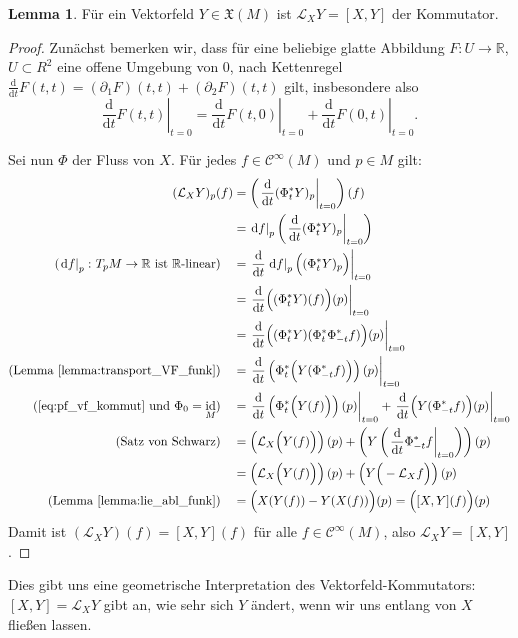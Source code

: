 \documentclass[a4paper]{scrbook}
\numberwithin{equation}{chapter}
\newcommand{\D}{\mathrm{d}}
\DeclareMathOperator{\id}{id}
\newcommand{\sC}{\mathcal{C}^{\infty}}
\theoremstyle{definition}
\newtheorem{lemma}[defn]{Lemma}
\begin{document}
\begin{lemma}
	Für ein Vektorfeld $Y \in \mathfrak X(M)$ ist $\mathcal L_X Y = [X,Y]$ der Kommutator.

	\begin{proof}
		Zunächst bemerken wir, dass für eine beliebige glatte Abbildung $F \colon U \to \mathbb R$, $U \subset R^2$ eine offene Umgebung von 0, nach Kettenregel $\frac{\D}{\D t} F(t,t) = (\partial_1 F)(t,t) + (\partial_2 F)(t,t)$ gilt, insbesondere also
		\begin{equation} \label{eq:pf_vf_kommut} \tag{$*$}
			\left.\frac{\D}{\D t} F(t,t)\right|_{t=0} = \left.\frac{\D}{\D t} F(t,0)\right|_{t=0} + \left.\frac{\D}{\D t} F(0,t)\right|_{t=0}.
		\end{equation}

		Sei nun $\Phi$ der Fluss von $X$. Für jedes $f\in \sC(M)$ und $p\in M$ gilt:
		\begingroup
		\allowdisplaybreaks
		\begin{align*}
			(\mathcal L_X Y)_p(f) &= \left(\left.\frac{\D}{\D t}(\Phi_t^* Y)_p\right|_{t=0}\right)(f)\\
			&= \left.\D f\right|_p \left(\left.\frac{\D}{\D t}(\Phi_t^* Y)_p\right|_{t=0}\right)\\
			\text{($\left.\D f\right|_p\colon T_pM \to \mathbb R$ ist $\mathbb R$-linear)} \quad &= \left.\frac{\D}{\D t}\left.\D f\right|_p \Big((\Phi_t^* Y)_p\Big)\right|_{t=0}\\
			&= \left.\frac{\D}{\D t} \Big((\Phi_t^* Y) (f)\Big)(p)\right|_{t=0}\\
			&= \left.\frac{\D}{\D t}\Big((\Phi_t^* Y)(\Phi_t^* \Phi_{-t}^*f)\Big)(p)\right|_{t=0}\\
			\text{(Lemma \ref{lemma:transport_VF_funk})} \quad &= \left.\frac{\D}{\D t} \left(\Phi_t^* \Big(Y(\Phi_{-t}^*f)\Big)\right)(p) \right|_{t=0}\\
			\text{(\eqref{eq:pf_vf_kommut} und $\Phi_0 = \id_M$)} \quad &= \left.\frac{\D}{\D t}\left(\Phi_t^* \Big(Y(f)\Big)\right) (p) \right|_{t=0} + \left.\frac{\D}{\D t} \Big(Y(\Phi_{-t}^*f)\Big) (p) \right|_{t=0}\\
			\text{(Satz von Schwarz)} \quad &= \left(\mathcal L_X \Big(Y(f)\Big)\right)(p) + \left(Y\left( \left.\frac{\D}{\D t} \Phi_{-t}^*f \right|_{t=0} \right)\right)(p)\\
			&= \left(\mathcal L_X \Big(Y(f)\Big)\right)(p) + \left(Y\Big( - \mathcal L_X f \Big)\right)(p)\\
			\text{(Lemma \ref{lemma:lie_abl_funk})} \quad &= \Big(X(Y(f)) - Y(X(f))\Big)(p) = \Big([X,Y](f)\Big)(p)
		\end{align*}%
		\endgroup
		Damit ist $(\mathcal L_X Y)(f) = [X,Y](f)$ für alle $f\in\sC(M)$, also $\mathcal L_X Y = [X,Y]$.
	\end{proof}
\end{lemma}
Dies gibt uns eine geometrische Interpretation des Vektorfeld-Kommutators: $[X,Y] = \mathcal L_X Y$ gibt an, wie sehr sich $Y$ ändert, wenn wir uns entlang von $X$ fließen lassen.
\end{document}
